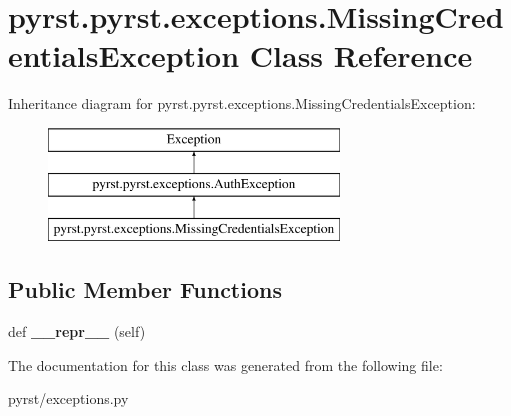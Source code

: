 \hypertarget{classpyrst_1_1pyrst_1_1exceptions_1_1_missing_credentials_exception}{}\section{pyrst.\+pyrst.\+exceptions.\+Missing\+Credentials\+Exception Class Reference}
\label{classpyrst_1_1pyrst_1_1exceptions_1_1_missing_credentials_exception}
Inheritance diagram for pyrst.\+pyrst.\+exceptions.\+Missing\+Credentials\+Exception\+:\begin{figure}[H]
\begin{center}
\leavevmode
\includegraphics[height=3.000000cm]{classpyrst_1_1pyrst_1_1exceptions_1_1_missing_credentials_exception}
\end{center}
\end{figure}
\subsection*{Public Member Functions}
\begin{DoxyCompactItemize}
\item 
\hypertarget{classpyrst_1_1pyrst_1_1exceptions_1_1_missing_credentials_exception_a532736b9cb49859c7c8a3dab5f6b8cdc}{}def {\bfseries \+\_\+\+\_\+repr\+\_\+\+\_\+} (self)\label{classpyrst_1_1pyrst_1_1exceptions_1_1_missing_credentials_exception_a532736b9cb49859c7c8a3dab5f6b8cdc}

\end{DoxyCompactItemize}


The documentation for this class was generated from the following file\+:\begin{DoxyCompactItemize}
\item 
pyrst/exceptions.\+py\end{DoxyCompactItemize}
